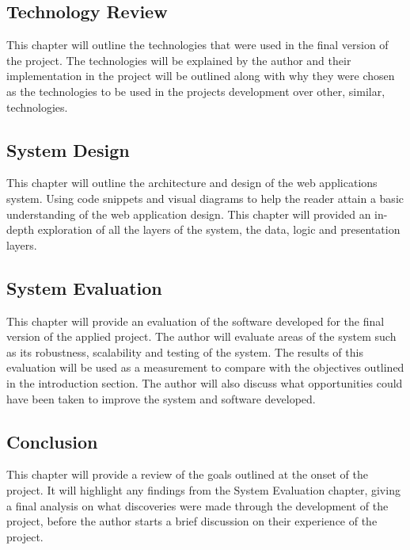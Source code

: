 \subsection{Technology Review} 
This chapter will outline the technologies that were used in the final version of the project. The technologies will be explained by the author and their implementation in the project will be outlined along with why they were chosen as the technologies to be used in the projects development over other, similar, technologies.
\subsection{System Design} 
This chapter will outline the architecture and design of the web applications
system. Using code snippets and visual diagrams to help the reader attain a basic
understanding of the web application design. This chapter will provided an in-depth exploration of all the layers of the system, the data, logic and presentation layers. 
\subsection{System Evaluation}
This chapter will provide an evaluation of the software developed for the final version of the applied project. The author will evaluate areas of the system such as its robustness, scalability and testing of the system. The results of this evaluation will be used as a measurement to compare with the objectives outlined in the introduction section. The author will also discuss what opportunities could have been taken to improve the system and software developed. 
\subsection{Conclusion} 
This chapter will provide a review of the goals outlined at the onset of the project. It will highlight any findings from the System Evaluation chapter, giving a final analysis on what discoveries were made through the development of the project, before the author starts a brief discussion on their experience of the project. 

